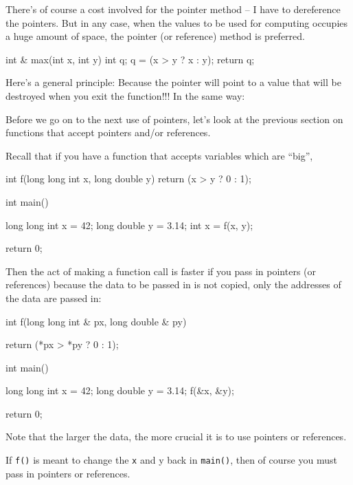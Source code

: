 There's of course a cost involved for the pointer method -- I have to dereference the pointers. But in any case, when the values to be used for computing occupies a huge amount of space, the pointer (or reference) method is preferred.


\begin{consolethree}[escapeinside=||]
int & max(int x, int y)
{
    int q;
    q = (x > y ? x : y);
    return q;
}
\end{consolethree}

Here's a general principle:  Because the pointer will point to a value that will be destroyed when you exit the function!!! In the same way: 

\newpage{}

Before we go on to the next use of pointers, let's look at the previous section on functions that accept pointers and/or references.

Recall that if you have a function that accepts variables which are ``big'',

\begin{consolethree}[escapeinside=||]
int f(long long int x, long double y)
{
    return (x > y ? 0 : 1);
}

int main()
{
    long long int x = 42;
    long double y = 3.14;
    int x = f(x, y);

    return 0;
}
\end{consolethree}
Then the act of making a function call is faster if you pass in pointers (or references) because the data to be passed in is not copied, only the addresses of the data are passed in:

\begin{consolethree}[escapeinside=||]
int f(long long int & px, long double & py)
{
    return (*px > *py ? 0 : 1);

}

int main()
{
    long long int x = 42;
    long double y = 3.14;
    f(&x, &y);

    return 0;
}
\end{consolethree}
Note that the larger the data, the more crucial it is to use pointers or references.

If \texttt{f()} is meant to change the \texttt{x} and y back in \texttt{main()}, then of course you must pass in pointers or references.

